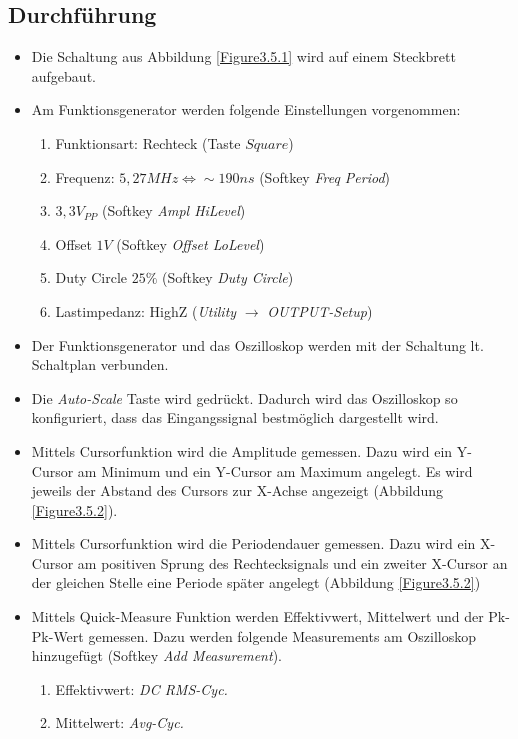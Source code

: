 \documentclass[12pt,a4paper,titlepage]{article}
\begin{document}
\subsection{Durchf\"uhrung}
\begin{itemize}
  \item Die Schaltung aus Abbildung \ref{Figure3.5.1} wird auf einem Steckbrett aufgebaut.
  \item Am Funktionsgenerator werden folgende Einstellungen vorgenommen:
    \begin{enumerate}
      \item Funktionsart: Rechteck (Taste $Square$)
      \item Frequenz: $5,27 MHz \Leftrightarrow \sim190 ns$ (Softkey \textit{Freq Period})
      \item $3,3 V_{PP}$ (Softkey \textit{Ampl HiLevel})
      \item Offset $1 V$ (Softkey \textit{Offset LoLevel})
      \item Duty Circle $25 \%$ (Softkey \textit{Duty Circle})
      \item Lastimpedanz: HighZ (\textit{Utility} $\rightarrow$ \textit{OUTPUT-Setup})
    \end{enumerate}
  \item Der Funktionsgenerator und das Oszilloskop werden mit der Schaltung lt. Schaltplan verbunden.
  \item Die \textit{Auto-Scale} Taste wird gedr\"uckt. Dadurch wird das Oszilloskop so konfiguriert, dass das Eingangssignal bestm\"oglich dargestellt wird.
  \item Mittels Cursorfunktion wird die Amplitude gemessen. Dazu wird ein Y-Cursor am Minimum und ein Y-Cursor am Maximum angelegt. Es wird jeweils der Abstand des Cursors zur X-Achse angezeigt (Abbildung \ref{Figure3.5.2}).
  \item Mittels Cursorfunktion wird die Periodendauer gemessen. Dazu wird ein X-Cursor am positiven Sprung des Rechtecksignals und ein zweiter X-Cursor an der gleichen Stelle eine Periode sp\"ater angelegt (Abbildung \ref{Figure3.5.2})
  \item Mittels Quick-Measure Funktion werden Effektivwert, Mittelwert und der Pk-Pk-Wert gemessen. Dazu werden folgende Measurements am Oszilloskop hinzugef\"ugt (Softkey \textit{Add Measurement}).
    \begin{enumerate}
      \item Effektivwert: \textit{DC RMS-Cyc.}
      \item Mittelwert: \textit{Avg-Cyc.}

\end{enumerate}
\end{itemize}
\end{document}

